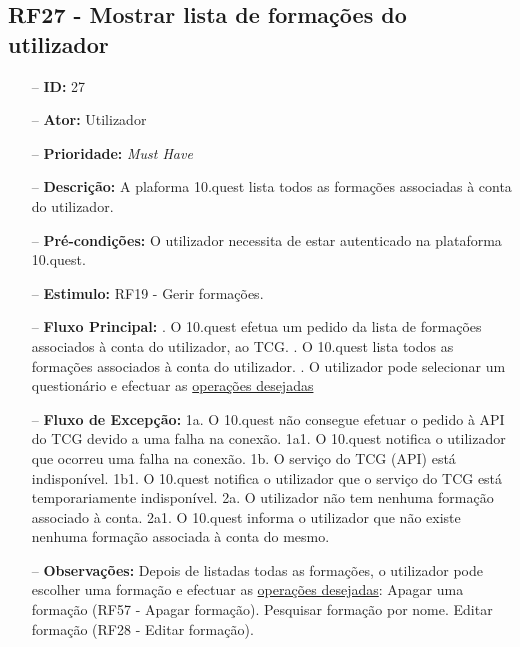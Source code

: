 \subsection{RF27 - Mostrar lista de formações do utilizador}
\begin{itemize}
	\item[--] \textbf{ID:} 27
	\item[--]  \textbf{Ator:} Utilizador
	\item[--]  \textbf{Prioridade:} \textit{Must Have}
	\item[--]  \textbf{Descrição:} A plaforma 10.quest lista todos as formações associadas à conta do utilizador.
	\item[--]  \textbf{Pré-condições:} O utilizador necessita de estar autenticado na plataforma 10.quest.
	\item[--]  \textbf{Estimulo:} RF19 - Gerir formações.
	\item[--]  \textbf{Fluxo Principal:} 
		. O 10.quest efetua um pedido da lista de formações associados à conta do utilizador, ao TCG.
		. O 10.quest lista todos as formações associados à conta do utilizador.
		. O utilizador pode selecionar um questionário e efectuar as \underline{operações desejadas}
	\item[--]  \textbf{Fluxo de Excepção:} 
		\subitem 1a. O 10.quest não consegue efetuar o pedido à API do TCG devido a uma falha na conexão.
		\subitem 1a1. O 10.quest notifica o utilizador que ocorreu uma falha na conexão.
		\subitem 1b. O serviço do TCG (API) está indisponível.
		\subitem 1b1. O 10.quest notifica o utilizador que o serviço do TCG está temporariamente indisponível. 
		\subitem 2a. O utilizador não tem nenhuma formação associado à conta.
		\subitem 2a1. O 10.quest informa o utilizador que não existe nenhuma formação associada à conta do mesmo.
	\item[--]  \textbf{Observações:} Depois de listadas todas as formações, o utilizador pode escolher uma formação e efectuar as \underline{operações desejadas}:
		\subitem Apagar uma formação (RF57 - Apagar formação).
		\subitem Pesquisar formação por nome.
		\subitem Editar formação (RF28 - Editar formação).
\end{itemize}
\newpage

